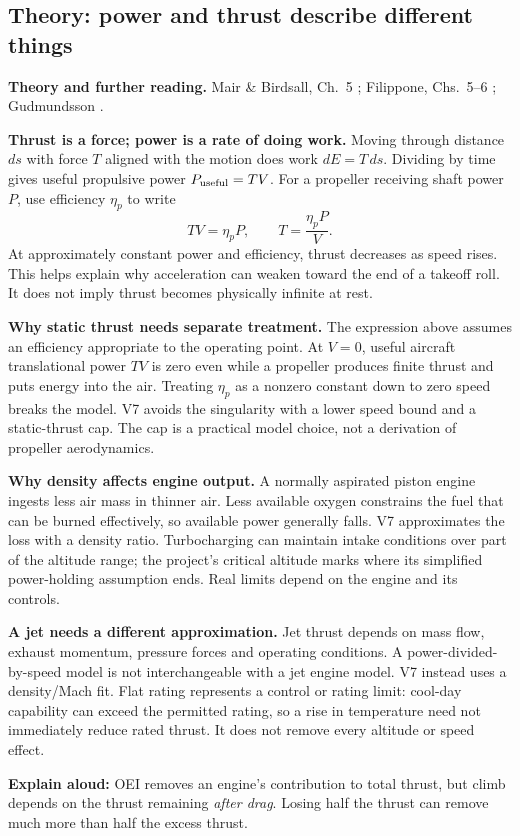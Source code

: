\documentclass[11pt,letterpaper]{article}
\newcommand{\theorypage}[1]{\clearpage\subsection*{\color{navy}\thesection\enspace Theory: #1}}
\newcommand{\reading}[1]{{\small\color{navy}\textbf{Theory and further reading.} #1\par}\vspace{3pt}}
\begin{document}
\theorypage{power and thrust describe different things}
\reading{Mair \& Birdsall, Ch.~5 \cite{mair}; Filippone, Chs.~5--6 \cite{filippone}; Gudmundsson \cite{gudmundsson}.}
\textbf{Thrust is a force; power is a rate of doing work.}
Moving through distance $ds$ with force $T$ aligned with the motion does work
$dE=T\,ds$. Dividing by time gives useful propulsive power $P_{\rm useful}=TV$.
For a propeller receiving shaft power $P$, use efficiency $\eta_p$ to write
\[
TV=\eta_p P,\qquad T=\frac{\eta_p P}{V}.
\]
At approximately constant power and efficiency, thrust decreases as speed rises.
This helps explain why acceleration can weaken toward the end of a takeoff roll.
It does not imply thrust becomes physically infinite at rest.

\textbf{Why static thrust needs separate treatment.}
The expression above assumes an efficiency appropriate to the operating point.
At $V=0$, useful aircraft translational power $TV$ is zero even while a propeller
produces finite thrust and puts energy into the air. Treating $\eta_p$ as a
nonzero constant down to zero speed breaks the model. V7 avoids the singularity
with a lower speed bound and a static-thrust cap. The cap is a practical model
choice, not a derivation of propeller aerodynamics.

\textbf{Why density affects engine output.}
A normally aspirated piston engine ingests less air mass in thinner air.
Less available oxygen constrains the fuel that can be burned effectively,
so available power generally falls. V7 approximates the loss with a density
ratio. Turbocharging can maintain intake conditions over part of the altitude
range; the project's critical altitude marks where its simplified power-holding
assumption ends. Real limits depend on the engine and its controls.

\textbf{A jet needs a different approximation.}
Jet thrust depends on mass flow, exhaust momentum, pressure forces and operating
conditions. A power-divided-by-speed model is not interchangeable with a jet
engine model. V7 instead uses a density/Mach fit. Flat rating represents a
control or rating limit: cool-day capability can exceed the permitted rating,
so a rise in temperature need not immediately reduce rated thrust. It does not
remove every altitude or speed effect.

\begin{keyidea}
\textbf{Explain aloud:} OEI removes an engine's contribution to total thrust,
but climb depends on the thrust remaining \emph{after drag}. Losing half the
thrust can remove much more than half the excess thrust.
\end{keyidea}
\end{document}
